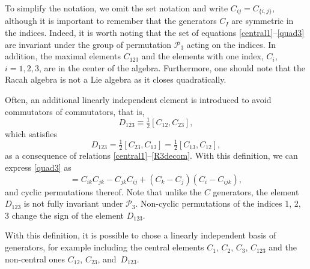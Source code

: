 \documentclass[pdftex]{sigma}
\numberwithin{equation}{section}
\begin{document}
 To simplify the notation, we omit the set notation and write $C_{ij} = C_{\{ i,j\}}$, although it is important to remember that the generators $C_I$ are symmetric in the indices. Indeed, it is worth noting that the set of equations \eqref{central1}--\eqref{quad3} are invariant under the group of permutation $\mathcal{P}_3$ acting on the indices. In addition, the maximal elements $C_{123}$ and the elements with one index, $C_i$, $i=1,2,3$, are in the center of the algebra. Furthermore, one should note that the Racah algebra is not a Lie algebra as it closes quadratically.

Often, an additional linearly independent element is introduced to avoid commutators of commutators, that is,
\begin{equation}%
D_{123}\equiv \tfrac 12 [C_{12}, C_{23}],
\end{equation}
which satisfies
\begin{equation}
D_{123}= \tfrac12 [C_{23}, C_{13}]= \tfrac12 [C_{13}, C_{12}],\label{D123alt}
\end{equation}
as a consequence of relations \eqref{central1}--\eqref{R3decom}.
With this definition, we can express \eqref{quad3} as
\begin{equation}
[C_{jk}, D_{ijk}] =C_{ik}C_{jk}-C_{jk}C_{ij}+(C_k-C_j)(C_i-C_{ijk}),\label{rank1inner}
\end{equation}
and cyclic permutations thereof. Note that unlike the $C$ generators, the element $D_{123}$ is not fully invariant under $\mathcal{P}_3$. Non-cyclic permutations of the indices 1, 2, 3 change the sign of the element $D_{123}$.

With this definition, it is possible to chose a linearly independent basis of generators, for example including the central elements $C_1$, $C_2$, $C_3$, $C_{123}$ and the non-central ones $C_{12}$, $C_{23}$, and~$D_{123}$.
\end{document}
